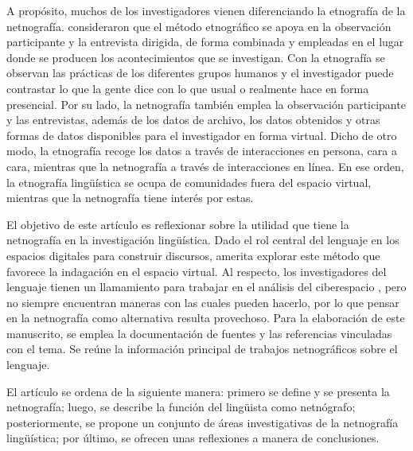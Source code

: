 A propósito, muchos de los investigadores vienen diferenciando la
etnografía de la netnografía. \textcite{hammersley1983ethnography} consideraron
que el método etnográfico se apoya en la observación participante y la
entrevista dirigida, de forma combinada y empleadas en el lugar donde se
producen los acontecimientos que se investigan. Con la etnografía se
observan las prácticas de los diferentes grupos humanos y el
investigador puede contrastar lo que la gente dice con lo que usual o
realmente hace en forma presencial. Por su lado, la netnografía también
emplea la observación participante y las entrevistas, además de los
datos de archivo, los datos obtenidos y otras formas de datos
disponibles para el investigador \cite{kulavuz-onal2015} en forma virtual.
Dicho de otro modo, la etnografía recoge los datos a través de
interacciones en persona, cara a cara, mientras que la netnografía a
través de interacciones en línea. En ese orden, la etnografía
lingüística se ocupa de comunidades fuera del espacio virtual, mientras
que la netnografía tiene interés por estas.

El objetivo de este artículo es reflexionar sobre la utilidad que tiene
la netnografía en la investigación lingüística. Dado el rol central del
lenguaje en los espacios digitales para construir discursos, amerita
explorar este método que favorece la indagación en el espacio virtual.
Al respecto, los investigadores del lenguaje tienen un llamamiento para
trabajar en el análisis del ciberespacio \cite{maine2021}, pero
no siempre encuentran maneras con las cuales pueden hacerlo, por lo que
pensar en la netnografía como alternativa resulta provechoso. Para la
elaboración de este manuscrito, se emplea la documentación de fuentes y
las referencias vinculadas con el tema. Se reúne la información
principal de trabajos netnográficos sobre el lenguaje.

El artículo se ordena de la siguiente manera: primero se define y se
presenta la netnografía; luego, se describe la función del lingüista
como netnógrafo; posteriormente, se propone un conjunto de áreas
investigativas de la netnografía lingüística; por último, se ofrecen
unas reflexiones a manera de conclusiones.